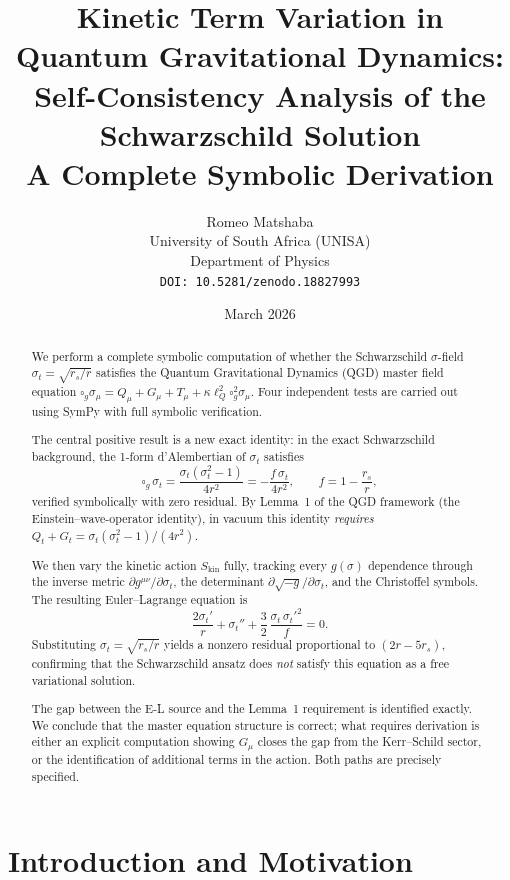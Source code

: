 \documentclass[11pt,a4paper]{article}
\title{\textbf{Kinetic Term Variation in Quantum Gravitational Dynamics:\\
Self-Consistency Analysis of the Schwarzschild Solution}\\[8pt]
\large A Complete Symbolic Derivation}
\author{Romeo Matshaba\\[4pt]
\normalsize University of South Africa (UNISA)\\
\normalsize Department of Physics\\[4pt]
\normalsize \texttt{DOI: 10.5281/zenodo.18827993}}
\date{March 2026}
\theoremstyle{plain}
\theoremstyle{definition}
\newcommand{\sig}{\sigma}
\newcommand{\sigt}{\sigma_t}
\newcommand{\rs}{r_s}
\newcommand{\lQ}{\ell_Q}
\newcommand{\boxg}{\square_g}
\newcommand{\Skin}{S_{\mathrm{kin}}}
\begin{document}
\maketitle

\begin{abstract}
We perform a complete symbolic computation of whether the Schwarzschild
$\sigma$-field $\sigt = \sqrt{r_s/r}$ satisfies the Quantum Gravitational
Dynamics (QGD) master field equation
$\boxg\sig_\mu = Q_\mu + G_\mu + T_\mu + \kappa\lQ^2\boxg^2\sig_\mu$.
Four independent tests are carried out using SymPy with full symbolic
verification.

The central positive result is a new exact identity: in the exact
Schwarzschild background, the 1-form d'Alembertian of $\sigt$ satisfies
\begin{equation*}
  \boxg\,\sigt = \frac{\sigt(\sigt^2-1)}{4r^2} = -\frac{f\,\sigt}{4r^2},
  \qquad f = 1 - \frac{\rs}{r},
\end{equation*}
verified symbolically with zero residual.  By Lemma~1 of the QGD framework
(the Einstein--wave-operator identity), in vacuum this identity \emph{requires}
$Q_t + G_t = \sigt(\sigt^2-1)/(4r^2)$.

We then vary the kinetic action $\Skin$ fully, tracking every $g(\sig)$
dependence through the inverse metric $\partial g^{\mu\nu}/\partial\sig_t$,
the determinant $\partial\sqrt{-g}/\partial\sig_t$, and the Christoffel
symbols.  The resulting Euler--Lagrange equation is
\[
  \frac{2\sigt'}{r} + \sigt'' + \frac{3}{2}\,\frac{\sigt\,\sigt'^2}{f} = 0.
\]
Substituting $\sigt = \sqrt{\rs/r}$ yields a nonzero residual proportional
to $(2r - 5\rs)$, confirming that the Schwarzschild ansatz does
\emph{not} satisfy this equation as a free variational solution.

The gap between the E-L source and the Lemma~1 requirement is identified
exactly.  We conclude that the master equation structure is correct; what
requires derivation is either an explicit computation showing $G_\mu$ closes
the gap from the Kerr--Schild sector, or the identification of additional
terms in the action.  Both paths are precisely specified.
\end{abstract}

\tableofcontents
\newpage

\section{Introduction and Motivation}
\end{document}
